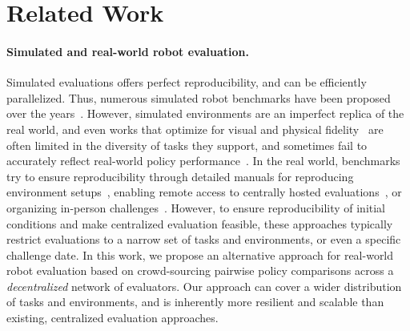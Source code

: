 \section{Related Work}
\label{sec:related}

\paragraph{Simulated and real-world robot evaluation.}
Simulated evaluations offers perfect reproducibility, and can be efficiently parallelized. Thus, numerous simulated robot benchmarks have been proposed over the years~\citep{tassa2018deepmind, todorov2012mujoco, kolve2017ai2, james2020rlbench, lee2021ikea, mees2022calvin, srivastava2022behavior, liu2023libero, bao2023dexart, xiang2023rmbench, pumacay2024colosseum, nasiriany2024robocasa}. However, simulated environments are an imperfect replica of the real world, and even works that optimize for visual and physical fidelity~\citep{li24simpler} are often limited in the diversity of tasks they support, and sometimes fail to accurately reflect real-world policy performance~\citep{zhou2025autoeval}. In the real world, benchmarks try to ensure reproducibility through detailed manuals for reproducing environment setups~\citep{calli2015ycb, yang2019replab, heo2023furniturebench, luo2023fmb, collins2023ramp, khargonkar2024scenereplica}, enabling remote access to centrally hosted evaluations~\citep{pickem2017robotarium, bauer2022real, zhou2023train, zhou2025autoeval}, or organizing in-person challenges~\citep{kitano1997robocup, krotkov2018darpa, correll2016analysis, yenamandra2024towards, EarthRoverChallengeWebsite}. However, to ensure reproducibility of initial conditions and make centralized evaluation feasible, these approaches typically restrict evaluations to a narrow set of tasks and environments, or even a specific challenge date. %
In this work, we propose an alternative approach for real-world robot evaluation based on crowd-sourcing pairwise policy comparisons across a \emph{decentralized} network of evaluators. Our approach can cover a wider distribution of tasks and environments, and is inherently more resilient and scalable than existing, centralized evaluation approaches.

